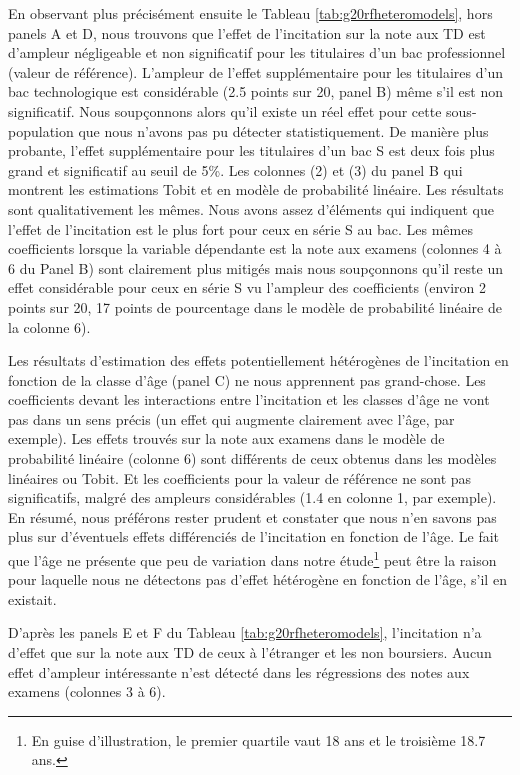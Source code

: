 \documentclass[
]{book}
\begin{document}
En observant plus précisément ensuite le Tableau \ref{tab:g20rfheteromodels}, hors panels A et D, nous trouvons que l'effet de l'incitation sur la note aux TD est d'ampleur négligeable et non significatif pour les titulaires d'un bac professionnel (valeur de référence). L'ampleur de l'effet supplémentaire pour les titulaires d'un bac technologique est considérable (2.5 points sur 20, panel B) même s'il est non significatif. Nous soupçonnons alors qu'il existe un réel effet pour cette sous-population que nous n'avons pas pu détecter statistiquement. De manière plus probante, l'effet supplémentaire pour les titulaires d'un bac S est deux fois plus grand et significatif au seuil de 5\%. Les colonnes (2) et (3) du panel B qui montrent les estimations Tobit et en modèle de probabilité linéaire. Les résultats sont qualitativement les mêmes. Nous avons assez d'éléments qui indiquent que l'effet de l'incitation est le plus fort pour ceux en série S au bac. Les mêmes coefficients lorsque la variable dépendante est la note aux examens (colonnes 4 à 6 du Panel B) sont clairement plus mitigés mais nous soupçonnons qu'il reste un effet considérable pour ceux en série S vu l'ampleur des coefficients (environ 2 points sur 20, 17 points de pourcentage dans le modèle de probabilité linéaire de la colonne 6).

Les résultats d'estimation des effets potentiellement hétérogènes de l'incitation en fonction de la classe d'âge (panel C) ne nous apprennent pas grand-chose. Les coefficients devant les interactions entre l'incitation et les classes d'âge ne vont pas dans un sens précis (un effet qui augmente clairement avec l'âge, par exemple). Les effets trouvés sur la note aux examens dans le modèle de probabilité linéaire (colonne 6) sont différents de ceux obtenus dans les modèles linéaires ou Tobit. Et les coefficients pour la valeur de référence ne sont pas significatifs, malgré des ampleurs considérables (1.4 en colonne 1, par exemple). En résumé, nous préférons rester prudent et constater que nous n'en savons pas plus sur d'éventuels effets différenciés de l'incitation en fonction de l'âge. Le fait que l'âge ne présente que peu de variation dans notre étude\footnote{En guise d'illustration, le premier quartile vaut 18 ans et le troisième 18.7 ans.} peut être la raison pour laquelle nous ne détectons pas d'effet hétérogène en fonction de l'âge, s'il en existait.

D'après les panels E et F du Tableau \ref{tab:g20rfheteromodels}, l'incitation n'a d'effet que sur la note aux TD de ceux à l'étranger et les non boursiers. Aucun effet d'ampleur intéressante n'est détecté dans les régressions des notes aux examens (colonnes 3 à 6).
\end{document}
